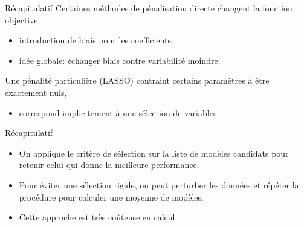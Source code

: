 \documentclass[
  ignorenonframetext,
]{beamer}
\providecommand{\tightlist}{%
  \setlength{\itemsep}{0pt}\setlength{\parskip}{0pt}}\usepackage{longtable,booktabs,array}
\begin{document}
\begin{frame}{Récapitulatif}
\protect\hypertarget{ruxe9capitulatif-3}{}
Certaines méthodes de pénalisation directe changent la fonction
objective:

\begin{itemize}
\tightlist
\item
  introduction de biais pour les coefficients.
\item
  idée globale: échanger biais contre variabilité moindre.
\end{itemize}

Une pénalité particulière (LASSO) contraint certains paramètres à être
exactement nuls,

\begin{itemize}
\tightlist
\item
  correspond implicitement à une sélection de variables.
\end{itemize}
\end{frame}

\begin{frame}{Récapitulatif}
\protect\hypertarget{ruxe9capitulatif-4}{}
\begin{itemize}
\tightlist
\item
  On applique le critère de sélection sur la liste de modèles candidats
  pour retenir celui qui donne la meilleure performance.
\item
  Pour éviter une sélection rigide, on peut perturber les données et
  répéter la procédure pour calculer une moyenne de modèles.
\item
  Cette approche est très coûteuse en calcul.
\end{itemize}
\end{frame}
\end{document}
